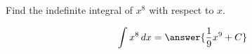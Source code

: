 \documentclass{ximera}
\author{Gregory Hartman \and Matthew Carr}
\begin{document}
\begin{exercise}


Find the indefinite integral of $x^8$ with respect to $x$.

\[
\int x^8\d x=\answer{\frac{1}{9}x^9+C}
\]


\end{exercise}
\end{document}
